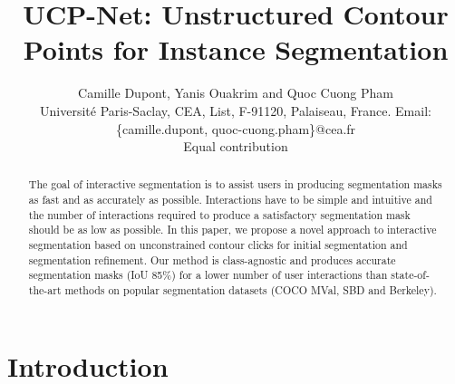 \documentclass[letterpaper, 10 pt, conference]{ieeeconf}
\title{\LARGE \bf
UCP-Net: Unstructured Contour Points for Instance Segmentation
}
\author{Camille Dupont, Yanis Ouakrim and Quoc Cuong Pham \\
\small Université Paris-Saclay, CEA, List, F-91120, Palaiseau, France. Email: \{camille.dupont, quoc-cuong.pham\}@cea.fr\\
\small *Equal contribution
}
\begin{document}




\thispagestyle{empty}
\pagestyle{empty}



\begin{abstract}

The goal of interactive segmentation is to assist users in producing segmentation masks as fast and as accurately as possible. Interactions have to be simple and intuitive and the number of interactions required to produce a satisfactory segmentation mask should be as low as possible. In this paper, we propose a novel approach to interactive segmentation based on unconstrained contour clicks for initial segmentation and segmentation refinement. Our method is class-agnostic and produces accurate segmentation masks (IoU  85\%) for a lower number of user interactions than state-of-the-art methods on popular segmentation datasets (COCO MVal, SBD and Berkeley).

\end{abstract}




\section{Introduction}
\end{document}
